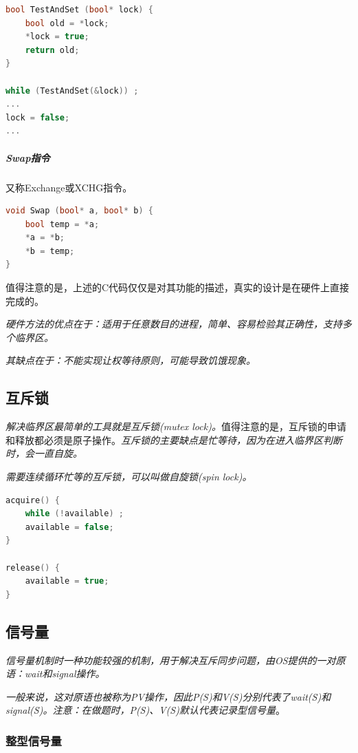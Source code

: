 \begin{lstlisting}[language=C++]
bool TestAndSet (bool* lock) {
    bool old = *lock;
    *lock = true;
    return old;
}

while (TestAndSet(&lock)) ;
...
lock = false;
...
\end{lstlisting}

\subparagraph{Swap指令}

    又称Exchange或XCHG指令。

\begin{lstlisting}[language=C++]
void Swap (bool* a, bool* b) {
    bool temp = *a;
    *a = *b;
    *b = temp;
}
\end{lstlisting}

    值得注意的是，上述的C代码仅仅是对其功能的描述，真实的设计是在硬件上直接完成的。

    \emph{硬件方法的优点在于：适用于任意数目的进程，简单、容易检验其正确性，支持多个临界区。}

    \emph{其缺点在于：不能实现让权等待原则，可能导致饥饿现象。}

\subsection{互斥锁}

    \emph{解决临界区最简单的工具就是互斥锁(mutex lock)。}值得注意的是，互斥锁的申请和释放都必须是原子操作。\emph{互斥锁的主要缺点是忙等待，因为在进入临界区判断时，会一直自旋。}

    \emph{需要连续循环忙等的互斥锁，可以叫做自旋锁(spin lock)。}

\begin{lstlisting}[language=C++]
acquire() {
    while (!available) ;
    available = false;
}

release() {
    available = true;
}
\end{lstlisting}

\subsection{信号量}

    \emph{信号量机制时一种功能较强的机制，用于解决互斥同步问题，由OS提供的一对原语：wait和signal操作。}

    \emph{一般来说，这对原语也被称为PV操作，因此P(S)和V(S)分别代表了wait(S)和signal(S)。\color{red}注意：在做题时，P(S)、V(S)默认代表记录型信号量}。

\subsubsection{整型信号量}

